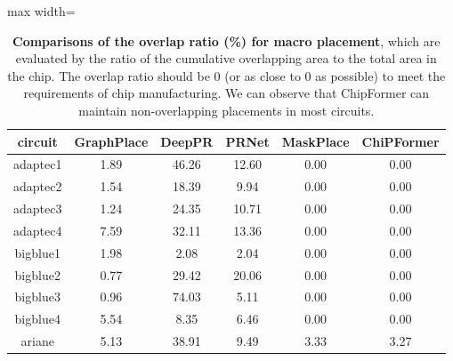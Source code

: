 \documentclass{article}
\theoremstyle{plain}
\theoremstyle{definition}
\theoremstyle{remark}
\begin{document}
\begin{table}[!htb]
	\caption{
		\textbf{Comparisons of the overlap ratio (\%) for macro placement}, which are evaluated by the ratio of the cumulative overlapping area to the total area in the chip. The overlap ratio should be 0 (or as close to 0 as possible) to meet the requirements of chip manufacturing. We can observe that ChipFormer can maintain non-overlapping placements in most circuits.
	}
	\label{overlap}
	\begin{center}
		\begin{adjustbox}{max width=\columnwidth}
			\begin{tabular}{cccccc}
				\toprule circuit & GraphPlace & DeepPR & PRNet & MaskPlace & ChiPFormer \\
				\midrule
				adaptec1  & 1.89 & 46.26 & 12.60 & {0.00} & {0.00}\\
				adaptec2   & 1.54 & 18.39 & 9.94 & {0.00} & {0.00}\\
				adaptec3   & 1.24& 24.35 & 10.71&  {0.00} & {0.00}\\
				adaptec4   & 7.59 & 32.11 & 13.36 & {0.00} & {0.00}\\
				bigblue1   & 1.98 & 2.08 & 2.04 & {0.00} & {0.00}\\
				bigblue2  & 0.77 & 29.42 & 20.06 & {0.00} & {0.00}\\
				bigblue3  & 0.96 & 74.03 & 5.11 & {0.00} & {0.00}\\
				bigblue4  & 5.54 & 8.35 & 6.46 & {0.00} & {0.00}\\
				ariane & 5.13 & 38.91 & 9.49 & {3.33} & {3.27}\\
				\bottomrule
			\end{tabular}
		\end{adjustbox}
	\end{center}
\end{table}
\end{document}
